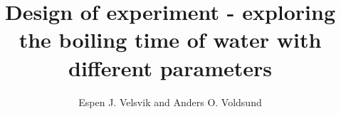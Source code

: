 \documentclass[10pt,a4paper]{article}
\begin{document}
\title{Design of experiment - exploring the boiling time of water with different parameters}
\author{Espen J. Velsvik and Anders O. Voldsund}
\maketitle






\end{document}
